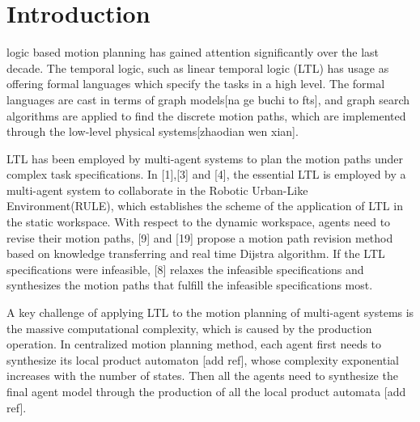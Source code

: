 \documentclass[journal]{IEEEtran}
\begin{document}
\section{Introduction}
%
%
%
%
 logic based motion planning has gained attention significantly over the last decade. The temporal logic, such as linear temporal logic (LTL) has usage as offering formal languages which specify the tasks in a high level. The formal languages are cast in terms of graph models[na ge buchi to fts], and graph search algorithms are applied to find the discrete motion paths, which are implemented through the low-level physical systems[zhaodian wen xian].\par
LTL has been employed by multi-agent systems to plan the motion paths under complex task specifications. In [1],[3] and [4], the essential LTL is employed by a multi-agent system to collaborate in the Robotic Urban-Like Environment(RULE), which establishes the scheme of the application of LTL in the static workspace. With respect to the dynamic workspace, agents need to revise their motion paths, [9] and [19] propose a motion path revision method based on knowledge transferring and real time Dijstra algorithm. If the LTL specifications were infeasible, [8] relaxes the infeasible specifications and synthesizes the motion paths that fulfill the infeasible specifications most. \par
A key challenge of applying LTL to the motion planning of multi-agent systems is the massive computational complexity, which is caused by the production operation. In centralized motion planning method, each agent first needs to synthesize its local product automaton [add ref], whose complexity exponential increases with the number of states. Then all the agents need to synthesize the final agent model through the production of all the local product automata [add ref].

\end{document}
